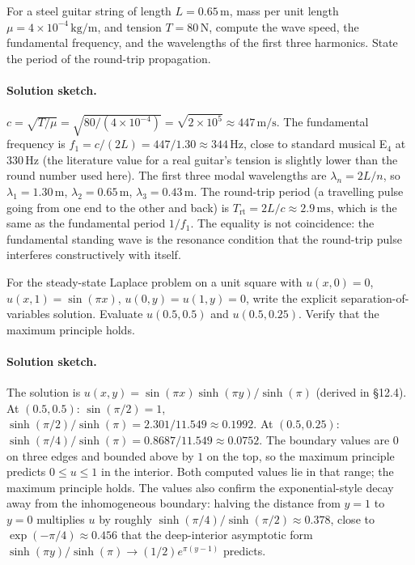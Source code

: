 \begin{exercise}
For a steel guitar string of length $L = 0.65\,\si{\meter}$, mass
per unit length $\mu = 4 \times 10^{-4}\,\si{\kilogram\per\meter}$,
and tension $T = 80\,\si{\newton}$, compute the wave speed, the
fundamental frequency, and the wavelengths of the first three
harmonics. State the period of the round-trip propagation.

\paragraph{Solution sketch.}
$c = \sqrt{T/\mu} = \sqrt{80/(4 \times 10^{-4})} = \sqrt{2 \times
10^{5}} \approx 447\,\si{\meter\per\second}$. The fundamental
frequency is $f_{1} = c/(2L) = 447/1.30 \approx 344\,\si{\hertz}$,
close to standard musical E$_{4}$ at $330\,\si{\hertz}$ (the
literature value for a real guitar's tension is slightly lower
than the round number used here). The first three modal
wavelengths are $\lambda_{n} = 2L/n$, so $\lambda_{1} =
1.30\,\si{\meter}$, $\lambda_{2} = 0.65\,\si{\meter}$,
$\lambda_{3} = 0.43\,\si{\meter}$. The round-trip period (a
travelling pulse going from one end to the other and back) is
$T_{\text{rt}} = 2 L / c \approx 2.9\,\si{\milli\second}$, which
is the same as the fundamental period $1/f_{1}$. The equality is
not coincidence: the fundamental standing wave is the resonance
condition that the round-trip pulse interferes constructively
with itself.
\end{exercise}

\begin{exercise}
For the steady-state Laplace problem on a unit square with
$u(x, 0) = 0$, $u(x, 1) = \sin(\pi x)$, $u(0, y) = u(1, y) = 0$,
write the explicit separation-of-variables solution. Evaluate
$u(0.5, 0.5)$ and $u(0.5, 0.25)$. Verify that the maximum
principle holds.

\paragraph{Solution sketch.}
The solution is $u(x, y) = \sin(\pi x) \sinh(\pi y)/\sinh(\pi)$
(derived in §12.4). At $(0.5, 0.5)$: $\sin(\pi/2) = 1$,
$\sinh(\pi/2)/\sinh(\pi) = 2.301/11.549 \approx 0.1992$. At
$(0.5, 0.25)$: $\sinh(\pi/4)/\sinh(\pi) = 0.8687/11.549 \approx
0.0752$. The boundary values are $0$ on three edges and bounded
above by $1$ on the top, so the maximum principle predicts
$0 \leq u \leq 1$ in the interior. Both computed values lie in
that range; the maximum principle holds. The values also confirm
the exponential-style decay away from the inhomogeneous boundary:
halving the distance from $y = 1$ to $y = 0$ multiplies $u$ by
roughly $\sinh(\pi/4)/\sinh(\pi/2) \approx 0.378$, close to
$\exp(-\pi/4) \approx 0.456$ that the deep-interior asymptotic
form $\sinh(\pi y)/\sinh(\pi) \to (1/2) e^{\pi(y - 1)}$ predicts.
\end{exercise}

